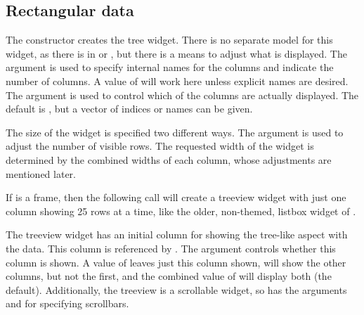 \subsection{Rectangular data}


The  constructor creates the tree
widget. There is no separate model for this widget, as there is in
\GTK{} or \Qt, but there is a means to adjust what is displayed.  The
argument  is used to specify internal
names for the columns and indicate the number of columns. A value of
 will work here unless explicit names are desired. The
argument  is used to control
which of the columns are actually displayed. The default is
, but a vector of indices or names can be given.  

The size of the widget is specified two different ways.  The
 argument is used to adjust the number
of visible rows. The requested width of the widget is determined by
the combined widths of each column, whose adjustments are mentioned
later.



If  is a frame, then the following call will create a treeview
widget with just one column showing 25 rows at a time, like the older,
non-themed, listbox widget of \Tk.

\begin{Schunk}
\end{Schunk}



The treeview widget has an initial column for showing the tree-like
aspect with the data. This column is referenced by . The
 argument controls whether this column is
shown. A value of  leaves just this column shown,
 will show the other columns, but not the first, and
the combined value of  will display both (the
default).  Additionally, the treeview is a scrollable widget, so has
the arguments  and
 for specifying scrollbars.

